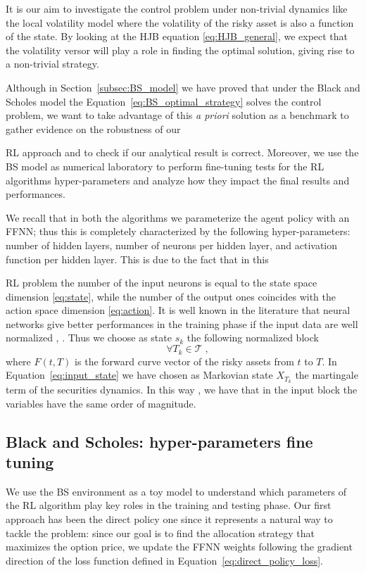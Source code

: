 \documentclass[runningheads]{m2ef}
\newcommand\soutpars[1]{\let\helpcmd\sout\parhelp#1\par\relax\relax}
\newcommand{\change}[1]{{\color{red} {#1}}}%
\newcommand{\remove}[1]{{\color{red} \soutpars{{#1}}}}%
\begin{document}
	It is our aim to investigate the control problem under non-trivial dynamics like the local volatility model where the volatility of the risky asset is also a function of the state. By looking at the HJB equation \eqref{eq:HJB_general}, we expect that the volatility versor will play a role in finding the optimal solution, giving rise to a non-trivial strategy.

	Although in Section~\ref{subsec:BS_model} we have proved that under the Black and Scholes model the Equation~\eqref{eq:BS_optimal_strategy} solves the control problem, we want to take advantage of this \textit{a priori} solution as a benchmark to gather evidence on the robustness of our \remove{Reinforcement Learning} \change{RL} approach and to check if our analytical result is correct. Moreover, we use the BS model as numerical laboratory to perform fine-tuning tests for the RL algorithms hyper-parameters and analyze how they impact the final results and performances.

	We recall that in both the algorithms we parameterize the agent policy with an FFNN; thus this is completely characterized by the following hyper-parameters: number of hidden layers, number of neurons per hidden layer, \change{and} activation function per hidden layer. This is due to the fact that in this \remove{Reinforcement Learning} \change{RL} problem the number of the input neurons is equal to the state space dimension \eqref{eq:state}, while the number of the output ones coincides with the action space dimension \eqref{eq:action}. It is well known in the literature that neural networks give better performances in the training phase if the input data are well normalized \cite{Puheim2014}, \cite{Sola1997}. Thus we choose as state $s_k$ the following normalized block  
	\begin{equation}
		[\log(S_{T_k}/F(0,T_k)), I_{T_k}/I_0, T_k ] \quad \forall T_k\in\mathcal{T} \; ,
	\label{eq:input_state}\end{equation}
	where $F(t,T)$ is the forward curve vector of the risky assets from $t$ to $T$. In Equation~\eqref{eq:input_state} we have chosen as Markovian state $X_{T_k}$ the martingale term of the securities dynamics. In this way\change{,} we have that in the input block the variables have the same order of magnitude.


	\subsection{Black and Scholes: hyper-parameters fine tuning}
	We use the BS environment as \change{a} toy model to understand which parameters of the RL algorithm play key roles in the training and testing phase. 
	Our first approach has been the direct policy one since it represents a natural way to tackle the problem: since our goal is to find the allocation 
	strategy that maximizes the option price, we update the FFNN weights following the gradient direction of the loss function defined in Equation~\eqref{eq:direct_policy_loss}. 
\end{document}
